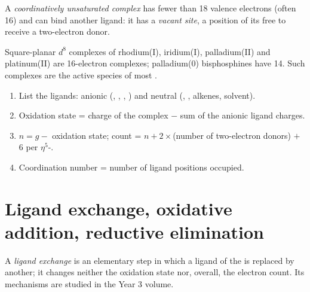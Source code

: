 \begin{definition}\label{def:b2:catalytic-cycles:unsaturated}
A \emph{coordinatively unsaturated complex}
has fewer than 18 valence electrons (often 16) and can bind another ligand: it has a
\emph{vacant site}, a position of its  free to
receive a two-electron donor.
\end{definition}

Square-planar $d^8$ complexes of rhodium(I), iridium(I), palladium(II) and
platinum(II) are 16-electron complexes; palladium(0) bisphosphines  have 14.
Such complexes are the active species of most .

\begin{method}\label{met:b2:catalytic-cycles:count-organometallic}
\begin{enumerate}
  \item List the ligands: anionic (, , , ) and neutral
        (, , alkenes, solvent).
  \item Oxidation state = charge of the complex $-$ sum of the anionic ligand charges.
  \item $n = g -$ oxidation state; count = $n + 2 \times$(number of two-electron donors)
        $+$ 6 per $\eta^5$-.
  \item Coordination number = number of ligand positions occupied.
\end{enumerate}
\end{method}

\section{Ligand exchange, oxidative addition, reductive elimination}

\begin{definition}\label{def:b2:catalytic-cycles:ligand-exchange}
A \emph{ligand exchange} is an elementary step in which a ligand of
the  is replaced by another; it changes neither the oxidation state
nor, overall, the electron count. Its mechanisms are studied in the Year 3 volume.
\end{definition}

